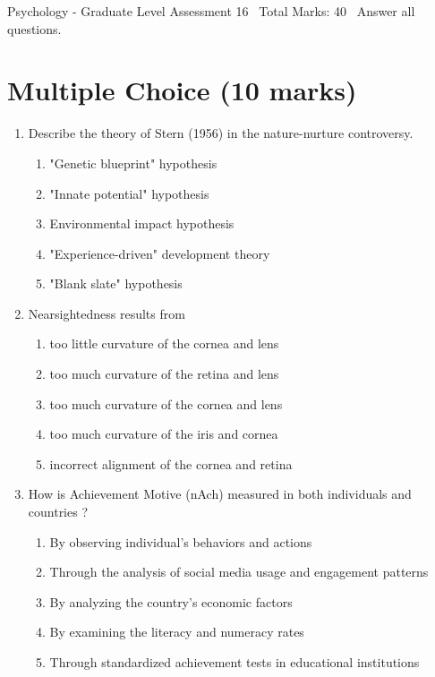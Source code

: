 \documentclass[12pt]{article}
\begin{document}
\begin{center}
Psychology - Graduate Level Assessment 16 \
Total Marks: 40 \
Answer all questions.
\end{center}

\section*{Multiple Choice (10 marks)}
\begin{enumerate}[label=\arabic*.]
\item Describe the theory of Stern (1956) in the nature-nurture controversy.
\begin{enumerate}[label=(\alph*)]
    \item "Genetic blueprint" hypothesis
    \item "Innate potential" hypothesis
    \item Environmental impact hypothesis
    \item "Experience-driven" development theory
    \item "Blank slate" hypothesis
\end{enumerate}
\item Nearsightedness results from
\begin{enumerate}[label=(\alph*)]
    \item too little curvature of the cornea and lens
    \item too much curvature of the retina and lens
    \item too much curvature of the cornea and lens
    \item too much curvature of the iris and cornea
    \item incorrect alignment of the cornea and retina
\end{enumerate}
\item How is Achievement Motive (nAch) measured in both individuals and countries ?
\begin{enumerate}[label=(\alph*)]
    \item By observing individual's behaviors and actions
    \item Through the analysis of social media usage and engagement patterns
    \item By analyzing the country's economic factors
    \item By examining the literacy and numeracy rates
    \item Through standardized achievement tests in educational institutions
\end{enumerate}

\end{enumerate}
\end{document}
